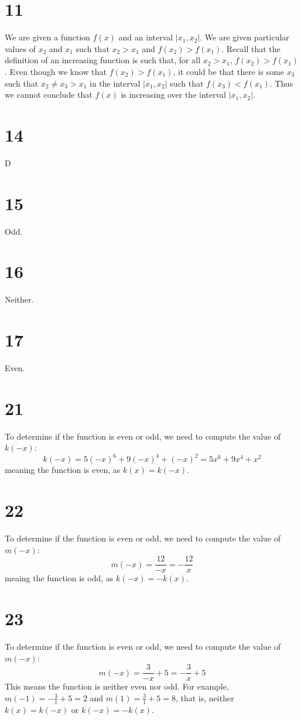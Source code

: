 \documentclass{article}
\theoremstyle{definition}
\newcommand{\?}{\stackrel{?}{=}}
\begin{document}
\section*{11}
We are given a function $f(x)$ and an interval $|x_1,x_2|$. We are given particular values of $x_2$ and $x_1$ such that $x_2>x_1$ and $f(x_2)>f(x_1)$. 
Recall that the definition of an increasing function is such that, for all $x_2>x_1$, $f(x_2)>f(x_1)$. 
Even though we know that $f(x_2)>f(x_1)$, it could be that there is some $x_3$ such that $x_2\ne x_3>x_1$ in the interval $|x_1,x_2|$ such that $f(x_3)<f(x_1)$. Thus 
we cannot conclude that $f(x)$ is increasing over the interval $|x_1,x_2|$.

\section*{14}
D

\section*{15}
Odd.

\section*{16}
Neither.

\section*{17}
Even.

\section*{21}
To determine if the function is even or odd, we need to compute the value of $k(-x)$:
\[ k(-x)=5(-x)^6+9(-x)^4+(-x)^2=5x^6+9x^4+x^2 \] meaning the function is even, as $k(x)=k(-x)$.

\section*{22}
To determine if the function is even or odd, we need to compute the value of $m(-x)$:
\[ m(-x)=\frac{12}{-x}=-\frac{12}{x} \] meaing the function is odd, as $k(-x)=-k(x)$.

\section*{23}
To determine if the function is even or odd, we need to compute the value of $m(-x)$:
\[ m(-x)=\frac{3}{-x}+5=-\frac{3}{x}+5 \] This means the function is neither even nor odd. For example, $m(-1)=-\frac{3}{1}+5=2$ and $m(1)=\frac{3}{1}+5=8$, that is, 
neither $k(x)=k(-x)$ or $k(-x)=-k(x)$.
\end{document}
